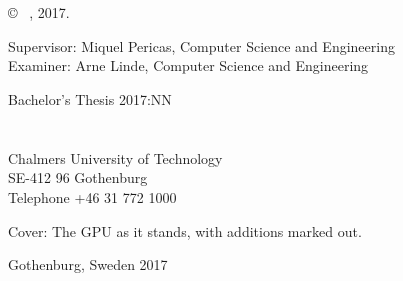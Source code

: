 \newpage
\thispagestyle{plain}
\vspace*{4.5cm}
\varHeadline \\
\varSubtitle \\
\varNames \setlength{\parskip}{1cm}

\copyright ~ \varNames, 2017. \setlength{\parskip}{1cm}

Supervisor: Miquel Pericas, Computer Science and Engineering\\
Examiner: Arne Linde, Computer Science and Engineering \setlength{\parskip}{1cm}

Bachelor's Thesis 2017:NN\\	%
\varDepartment \\
\varResearchGroupName\\
Chalmers University of Technology\\
SE-412 96 Gothenburg\\
Telephone +46 31 772 1000 \setlength{\parskip}{0.5cm}

\vfill
Cover: The GPU as it stands, with additions marked out. \setlength{\parskip}{0.5cm}

Gothenburg, Sweden 2017

